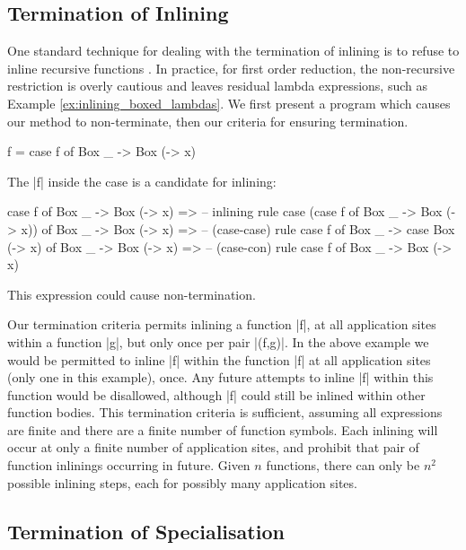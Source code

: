 \documentclass[preprint]{sigplanconf}
\begin{document}

\subsection{Termination of Inlining}

One standard technique for dealing with the termination of inlining is to refuse to inline recursive functions \cite{spj:inlining}. In practice, for first order reduction, the non-recursive restriction is overly cautious and leaves residual lambda expressions, such as Example \ref{ex:inlining_boxed_lambdas}. We first present a program which causes our method to non-terminate, then our criteria for ensuring termination.

\begin{example}
\begin{code}
f = case  f of
          Box _ -> Box (\x -> x)
\end{code}

The |f| inside the case is a candidate for inlining:

\begin{code}
case f of Box _ -> Box (\x -> x)
    => -- inlining rule
case (case f of Box _ -> Box (\x -> x)) of Box _ -> Box (\x -> x)
    => -- (case-case) rule
case f of Box _ -> case Box (\x -> x) of Box _ -> Box (\x -> x)
    => -- (case-con) rule
case f of Box _ -> Box (\x -> x)
\end{code}

This expression could cause non-termination.
\end{example}

Our termination criteria permits inlining a function |f|, at all application sites within a function |g|, but only once per pair |(f,g)|. In the above example we would be permitted to inline |f| within the function |f| at all application sites (only one in this example), once. Any future attempts to inline |f| within this function would be disallowed, although |f| could still be inlined within other function bodies. This termination criteria is sufficient, assuming all expressions are finite and there are a finite number of function symbols. Each inlining will occur at only a finite number of application sites, and prohibit that pair of function inlinings occurring in future. Given $n$ functions, there can only be $n^2$ possible inlining steps, each for possibly many application sites.


\subsection{Termination of Specialisation}
\label{sec:termination_specialisation}
\end{document}
